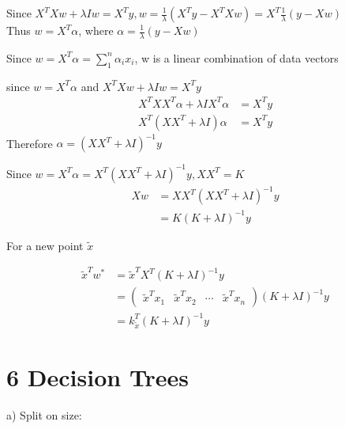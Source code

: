 \documentclass{article}
\newenvironment{problem}[2][$\bullet$]{\begin{trivlist}\large
		\item[\hskip \labelsep {\bfseries #1}\hskip \labelsep {\bfseries #2.}]}  {\end{trivlist}}
\newenvironment{sub}[2][$-$]{\begin{trivlist}
		\item[\hskip \labelsep {\bfseries #1}\hskip \labelsep {\bfseries #2.}]}  {\end{trivlist}}
\begin{document}
Since $X^TXw + \lambda I w = X^Ty, w = \frac{1}{\lambda}(X^Ty - X^TXw) =  X^T\frac{1}{\lambda}(y - Xw)$\\
Thus $w = X^T\alpha$, where $\alpha =\frac{1}{\lambda}(y - Xw) $

\begin{sub}{5.3}
\end{sub}
Since $w = X^T\alpha = \sum_{1}^{n} \alpha_i x_i$, w is a linear combination of data vectors 

\begin{sub}{5.4}
\end{sub}
since $w = X^T\alpha$ and $X^TXw + \lambda I w = X^Ty$
\begin{align}
X^TXX^T\alpha + \lambda I X^T\alpha &= X^Ty\\
X^T(XX^T+\lambda I)\alpha &= X^Ty\end{align}
Therefore $\alpha = (XX^T+\lambda I)^{-1}y$

\begin{sub}{5.5}
\end{sub}
Since $w = X^T\alpha = X^T(XX^T+\lambda I)^{-1}y, XX^T = K$
\begin{align} Xw &= XX^T(XX^T+\lambda I)^{-1}y \\ &= K(K+\lambda I )^{-1} y 
\end{align}

\begin{sub}{5.6}
\end{sub}

For a new point $\tilde{x}$

\begin{align}
\tilde{x}^T w^* &= \tilde{x}^TX^T(K+\lambda I)^{-1}y\\
&= \begin{pmatrix}
\tilde{x}^Tx_1 & \tilde{x}^Tx_2 & \cdots & \tilde{x}^Tx_n
\end{pmatrix}(K+\lambda I)^{-1}y\\
&= k_{\tilde{x}}^T(K+\lambda I)^{-1}y\
\end{align}


\pagebreak

\section{6 Decision Trees}

\begin{problem}{6.1 Building Trees by Hand}
\end{problem}
\begin{sub}{6.1.1}
\end{sub}
a) Split on size: 
\end{document}
